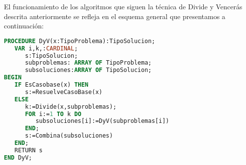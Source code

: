 El funcionamiento de los algoritmos que siguen la técnica de Divide y Vencerás
descrita anteriormente se refleja en el esquema general que presentamos a
continuación:

\begin{lstlisting}[language=Pascal]
PROCEDURE DyV(x:TipoProblema):TipoSolucion;
   VAR i,k,:CARDINAL;
      s:TipoSolucion;
      subproblemas: ARRAY OF TipoProblema;
      subsoluciones:ARRAY OF TipoSolucion;
BEGIN
   IF EsCasobase(x) THEN
      s:=ResuelveCasoBase(x)
   ELSE
      k:=Divide(x,subproblemas);
      FOR i:=1 TO k DO
         subsoluciones[i]:=DyV(subproblemas[i])
      END;
      s:=Combina(subsoluciones)
   END;
   RETURN s
END DyV;
\end{lstlisting} 